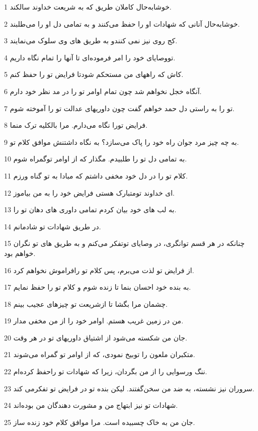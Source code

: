 \par 1 خوشا‌به‌حال کاملان طریق که به شریعت خداوند سالکند.
\par 2 خوشا‌به‌حال آنانی که شهادات او را حفظ می‌کنند و به تمامی دل او را می‌طلبند.
\par 3 کج روی نیز نمی کنندو به طریق های وی سلوک می‌نمایند.
\par 4 تووصایای خود را امر فرموده‌ای تا آنها را تمام نگاه داریم.
\par 5 کاش که راههای من مستحکم شودتا فرایض تو را حفظ کنم.
\par 6 آنگاه خجل نخواهم شد چون تمام اوامر تو را در مد نظر خود دارم.
\par 7 تو را به راستی دل حمد خواهم گفت چون داوریهای عدالت تو را آموخته شوم.
\par 8 فرایض تورا نگاه می‌دارم. مرا بالکلیه ترک منما.
\par 9 به چه چیز مرد جوان راه خود را پاک می‌سازد؟ به نگاه داشتنش موافق کلام تو.
\par 10 به تمامی دل تو را طلبیدم. مگذار که از اوامر توگمراه شوم.
\par 11 کلام تو را در دل خود مخفی داشتم که مبادا به تو گناه ورزم.
\par 12 ‌ای خداوند تومتبارک هستی فرایض خود را به من بیاموز.
\par 13 به لب های خود بیان کردم تمامی داوری های دهان تو را.
\par 14 در طریق شهادات تو شادمانم.
\par 15 چنانکه در هر قسم توانگری، در وصایای توتفکر می‌کنم و به طریق های تو نگران خواهم بود.
\par 16 از فرایض تو لذت می‌برم، پس کلام تو رافراموش نخواهم کرد.
\par 17 به بنده خود احسان بنما تا زنده شوم و کلام تو را حفظ نمایم.
\par 18 چشمان مرا بگشا تا ازشریعت تو چیزهای عجیب بینم.
\par 19 من در زمین غریب هستم. اوامر خود را از من مخفی مدار.
\par 20 جان من شکسته می‌شود از اشتیاق داوریهای تو در هر وقت.
\par 21 متکبران ملعون را توبیخ نمودی، که از اوامر تو گمراه می‌شوند.
\par 22 ننگ ورسوایی را از من بگردان، زیرا که شهادات تو راحفظ کرده‌ام.
\par 23 سروران نیز نشسته، به ضد من سخن‌گفتند. لیکن بنده تو در فرایض تو تفکرمی کند.
\par 24 شهادات تو نیز ابتهاج من و مشورت دهندگان من بوده‌اند.
\par 25 جان من به خاک چسبیده است. مرا موافق کلام خود زنده ساز.
